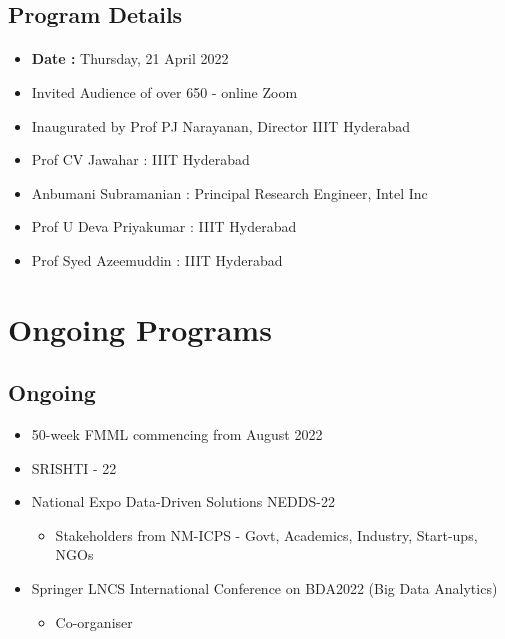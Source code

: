 \subsection{Program Details}
\begin{frame}[fragile=singleslide]{\insertsectionhead}
  \framesubtitle{\insertsubsectionhead}
\begin{center}
\begin{itemize}
\item \textbf{Date : } Thursday, 21 April 2022
\item Invited Audience of over 650 - online Zoom
\item Inaugurated by Prof PJ Narayanan, Director IIIT Hyderabad
\item Prof CV Jawahar : IIIT Hyderabad
\item Anbumani Subramanian : Principal Research Engineer, Intel Inc
\item Prof U Deva Priyakumar : IIIT Hyderabad
\item Prof Syed Azeemuddin : IIIT Hyderabad
\end{itemize}
\end{center}
\end{frame}

\section{Ongoing Programs}

\subsection{Ongoing}

\begin{frame}[fragile=singleslide]{\insertsectionhead}
\begin{center}
\begin{itemize}
\item 50-week FMML commencing from August 2022
\item SRISHTI - 22
\item National Expo Data-Driven Solutions NEDDS-22
\begin{itemize}
\item Stakeholders from NM-ICPS - Govt, Academics, Industry, Start-ups, NGOs
\end{itemize}
\item Springer LNCS International Conference on BDA2022 (Big Data Analytics) 
\begin{itemize}
\item Co-organiser
\end{itemize}
\end{itemize}
\end{center}
\end{frame}

